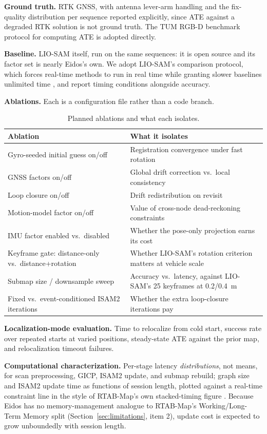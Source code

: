 \documentclass[conference]{IEEEtran}
\begin{document}
\textbf{Ground truth.} RTK GNSS, with antenna lever-arm handling and the fix-quality distribution per sequence reported explicitly, since ATE against a degraded RTK solution is not ground truth. The TUM RGB-D benchmark protocol \parencite{sturm2012benchmark} for computing ATE is adopted directly.

\textbf{Baseline.} LIO-SAM itself, run on the same sequences: it is open source and its factor set is nearly Eidos's own. We adopt LIO-SAM's comparison protocol, which forces real-time methods to run in real time while granting slower baselines unlimited time \parencite{shan2020liosam}, and report timing conditions alongside accuracy.

\textbf{Ablations.} Each is a configuration file rather than a code branch.

\begin{table}[t]
\centering
\footnotesize
\caption{Planned ablations and what each isolates.}
\label{tab:ablations}
\begin{tabular}{@{}p{3.6cm}p{4.2cm}@{}}
\toprule
Ablation & What it isolates \\
\midrule
Gyro-seeded initial guess on/off & Registration convergence under fast rotation \\
GNSS factors on/off & Global drift correction vs.\ local consistency \\
Loop closure on/off & Drift redistribution on revisit \\
Motion-model factor on/off & Value of cross-node dead-reckoning constraints \\
IMU factor enabled vs.\ disabled & Whether the pose-only projection earns its cost \\
Keyframe gate: distance-only vs.\ distance+rotation & Whether LIO-SAM's rotation criterion matters at vehicle scale \\
Submap size / downsample sweep & Accuracy vs.\ latency, against LIO-SAM's 25 keyframes at 0.2/0.4~m \\
Fixed vs.\ event-conditioned ISAM2 iterations & Whether the extra loop-closure iterations pay \\
\bottomrule
\end{tabular}
\end{table}

\textbf{Localization-mode evaluation.} Time to relocalize from cold start, success rate over repeated starts at varied positions, steady-state ATE against the prior map, and relocalization timeout failures.

\textbf{Computational characterization.} Per-stage latency \emph{distributions}, not means, for scan preprocessing, GICP, ISAM2 update, and submap rebuild; graph size and ISAM2 update time as functions of session length, plotted against a real-time constraint line in the style of RTAB-Map's own stacked-timing figure \parencite{labbe2019rtabmap}. Because Eidos has no memory-management analogue to RTAB-Map's Working/Long-Term Memory split (Section~\ref{sec:limitations}, item 2), update cost is expected to grow unboundedly with session length.
\end{document}
